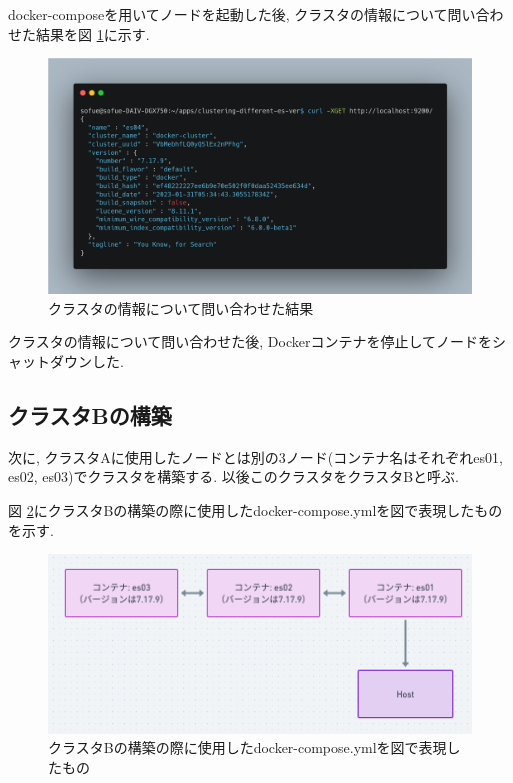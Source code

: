 
docker-composeを用いてノードを起動した後, クラスタの情報について問い合わせた結果を図 \ref{p1-1}に示す.

\begin{figure}[!ht]
  \begin{center}
    \includegraphics[width=160mm]{sotu/figure/es04-cluster.png}
    \caption{クラスタの情報について問い合わせた結果}
    \label{p1-1}
  \end{center}
\end{figure}

クラスタの情報について問い合わせた後, Dockerコンテナを停止してノードをシャットダウンした.

\subsection{クラスタBの構築}

次に, クラスタAに使用したノードとは別の3ノード(コンテナ名はそれぞれes01, es02, es03)でクラスタを構築する. 以後このクラスタをクラスタBと呼ぶ.

図 \ref{d4}にクラスタBの構築の際に使用したdocker-compose.ymlを図で表現したものを示す.

\begin{figure}[!ht]
  \begin{center}
    \includegraphics[width=160mm]{sotu/figure/all-7.19.9.png}
    \caption{クラスタBの構築の際に使用したdocker-compose.ymlを図で表現したもの}
    \label{d4}
  \end{center}
\end{figure}

